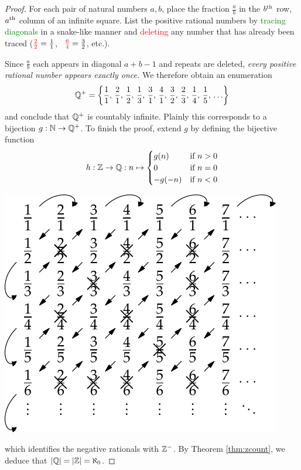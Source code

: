\begin{proof}
	For each pair of natural numbers $a,b$, place the fraction $\frac ab$ in the $b\textsuperscript{th}$ row, $a\textsuperscript{th}$ column of an infinite square. List the positive rational numbers by \textcolor{Green}{tracing diagonals} in a snake-like manner and \textcolor{red}{deleting} any number that has already been traced ($\textcolor{red}{\frac 22}=\frac 11$, \ $\textcolor{red}{\frac 64}=\frac 32$, etc.).\par
	\begin{minipage}[t]{0.58\linewidth}\vspace{-5pt}
		Since $\frac ab$ each appears in diagonal $a+b-1$ and repeats are deleted, \emph{every positive rational number appears exactly once.}	We therefore obtain an enumeration
		\[
			\mathbb{Q}^+=\left\{{\frac 11,\,\frac 21,\,\frac 12,\,\frac 13,\,\frac 31,\,\frac 41,\,\frac 32,\,\frac 23,\,\frac 14,\,\frac 15,\,\ldots}\right\}
		\]
		and conclude that $\mathbb{Q}^+$ is countably infinite. Plainly this corresponds to a bijection $g:\mathbb{N}\to\mathbb{Q}^+$. To finish the proof, extend $g$ by defining the bijective function
		\[
			h:\mathbb{Z}\to\mathbb{Q}:n\mapsto
			\begin{cases}
				g(n)&\text{if }n>0\\
				0&\text{if }n=0\\
				-g(-n)&\text{if }n<0
			\end{cases}
		\]
	\end{minipage}
	\hfill
	\begin{minipage}[t]{0.4\linewidth}\vspace{0pt}
		\flushright
		\includegraphics{cardinality-02-qcount}
	\end{minipage}
	\medbreak
	which identifies the negative rationals with $\mathbb{Z}^-$. By Theorem \ref{thm:zcount}, we deduce that $\left| \mathbb{Q}\right|=\left| \mathbb{Z}\right|=\aleph_0$.
\end{proof}


